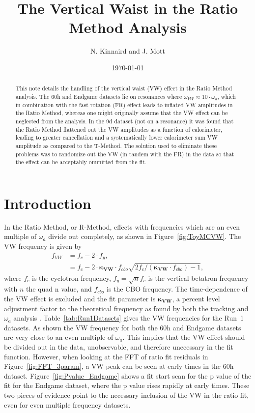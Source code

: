 \documentclass[12pt,letterpaper]{article}
\title{The Vertical Waist in the Ratio Method Analysis}
\author{N. Kinnaird and J. Mott}
\date{\today}
\newcommand{\figref}[1]{Figure~\ref{#1}}
\def\wa{$\omega_{a}$\xspace}
\begin{document}
\maketitle

\begin{abstract}
This note details the handling of the vertical waist (VW) effect in the Ratio Method analysis. The 60h and Endgame datasets lie on resonances where $\omega_{VW} \approx 10 \cdot \omega_{a}$, which in combination with the fast rotation (FR) effect leads to inflated VW amplitudes in the Ratio Method, whereas one might originally assume that the VW effect can be neglected from the analysis. In the 9d dataset (not on a resonance) it was found that the Ratio Method flattened out the VW amplitudes as a function of calorimeter, leading to greater cancellation and a systematically lower calorimeter sum VW amplitude as compared to the T-Method. The solution used to eliminate these problems was to randomize out the VW (in tandem with the FR) in the data so that the effect can be acceptably ommitted from the fit.
\end{abstract}


\section{Introduction}

In the Ratio Method, or R-Method, effects with frequencies which are an even multiple of \wa divide out completely, as shown in \figref{fig:ToyMCVW}. The VW frequency is given by
    \begin{align} \label{eq:VWfreqKappa}
        f_{VW} &= f_{c} - 2 \cdot f_{y}, \\
               &= f_{c} - 2 \cdot \boldsymbol{\kappa_{VW}} \cdot f_{cbo}\sqrt{2f_{c}/(\boldsymbol{\kappa_{VW}} \cdot f_{cbo})-1},
    \end{align}
where $f_{c}$ is the cyclotron frequency, $f_{y} = \sqrt{n}f_{c}$ is the vertical betatron frequency with $n$ the quad n value, and $f_{cbo}$ is the CBO frequency. The time-dependence of the VW effect is excluded and the fit parameter is $\boldsymbol{\kappa_{VW}}$, a percent level adjustment factor to the theoretical frequency as found by both the tracking and \wa analysis \cite{cbofrequency}. Table~\ref{tab:Run1Datasets} gives the VW frequencies for the Run~1 datasets. As shown the VW frequency for both the 60h and Endgame datasets are very close to an even multiple of \wa. This implies that the VW effect should be divided out in the data, unobservable, and therefore unecessary in the fit function. However, when looking at the FFT of ratio fit residuals in \figref{fig:FFT_3param}, a VW peak can be seen at early times in the 60h dataset. \figref{fig:Pvalue_Endgame} shows a fit start scan for the p value of the fit for the Endgame dataset, where the p value rises rapidly at early times. These two pieces of evidence point to the necessary inclusion of the VW in the ratio fit, even for even multiple frequency datasets.
\end{document}
